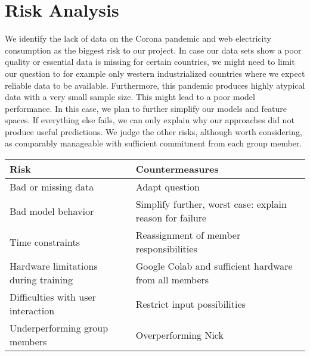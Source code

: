 \documentclass[s=english,inputenc=utf8,fontsize=10pt]{ldvarticle}
\begin{document}
\newpage

\section{Risk Analysis}

We identify the lack of data on the Corona pandemic and web electricity consumption as the biggest risk to our project. In case our data sets show a poor quality or essential data is missing for certain countries, we might need to limit our question to for example only western industrialized countries where we expect reliable data to be available. Furthermore, this pandemic produces highly atypical data with a very small sample size. This might lead to a poor model performance. In this case, we plan to further simplify our models and feature spaces. If everything else fails, we can only explain why our approaches did not produce useful predictions. We judge the other risks, although worth considering, as comparably manageable with sufficient commitment from each group member.

\begin{center}
	\begin{footnotesize}
		\setlength{\arrayrulewidth}{1,05pt}
		\begin{tabular}[htb]{|p{5cm}|p{7.1cm}|}
			\hline
			\textbf{Risk} & \textbf{Countermeasures} \\
			\hline
			\hline
			\rowcolor{lightgray} Bad or missing data & Adapt question \\
			\hline
			\rowcolor{lightgray} Bad model behavior & Simplify further, worst case: explain reason for failure \\
			\hline	
			\rowcolor{lightgray} Time constraints & Reassignment of member responsibilities \\
			\hline
			\rowcolor{lightgray} Hardware limitations during training & Google Colab and sufficient hardware from all members\\
			\hline
			\rowcolor{lightgray} Difficulties with user interaction & Restrict input possibilities \\
			\hline
			\rowcolor{lightgray} Underperforming group members & Overperforming Nick \\
			\hline	
		\end{tabular}
	\end{footnotesize}
\end{center}
\end{document}
